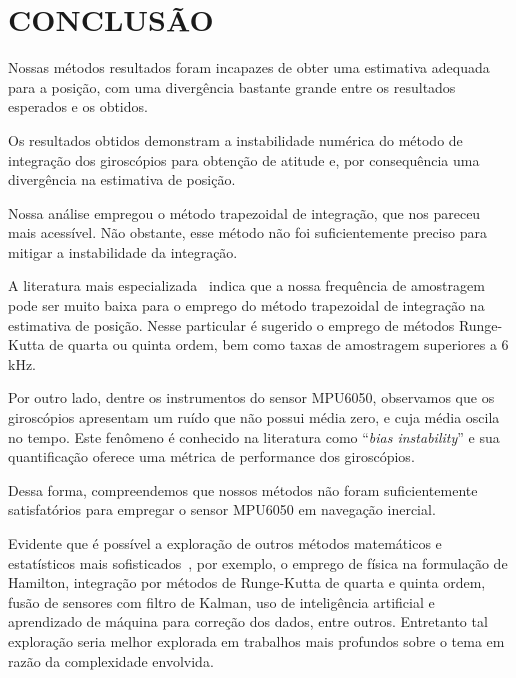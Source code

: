 \chapter*{CONCLUSÃO}\label{chap:conclusao}

Nossas métodos resultados foram incapazes de obter uma estimativa adequada para a posição, com uma divergência bastante grande entre os resultados esperados e os obtidos.

Os resultados obtidos demonstram a instabilidade numérica do método de integração dos giroscópios para obtenção de atitude e, por consequência uma divergência na estimativa de posição.

Nossa análise empregou o método trapezoidal de integração, que nos pareceu mais acessível. Não obstante, esse método não foi suficientemente preciso para mitigar a instabilidade da integração.

A literatura mais especializada~\cite{SAVAGE_2008} indica que a nossa frequência de amostragem pode ser muito baixa para o emprego do método trapezoidal de integração na estimativa de posição.
Nesse particular é sugerido o emprego de métodos Runge-Kutta de quarta ou quinta ordem, bem como taxas de amostragem superiores a 6 kHz.

Por outro lado, dentre os instrumentos do sensor MPU6050, observamos que os giroscópios apresentam um ruído que não possui média zero, e cuja média oscila no tempo. Este fenômeno é conhecido na literatura como ``\emph{bias instability}'' e sua quantificação oferece uma métrica de performance dos giroscópios.

Dessa forma, compreendemos que nossos métodos não foram suficientemente satisfatórios para empregar o sensor MPU6050 em navegação inercial.

Evidente que é possível a exploração de outros métodos matemáticos e estatísticos mais sofisticados~\cite{SAVAGE_2008_2}, por exemplo, o emprego de física na formulação de Hamilton, integração por métodos de Runge-Kutta de quarta e quinta ordem, fusão de sensores com filtro de Kalman, uso de inteligência artificial e aprendizado de máquina para correção dos dados, entre outros. Entretanto tal exploração seria melhor explorada em trabalhos mais profundos sobre o tema em razão da complexidade envolvida.
